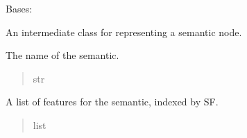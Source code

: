 \documentclass[letterpaper,10pt,english]{sphinxmanual}
\begin{document}

\begin{fulllineitems}
\label{\detokenize{nodes:nodes.nodeBuilder.Semantic}}
\pysigstartsignatures
\pysiglinewithargsret
{}
{}
{}
\pysigstopsignatures
\sphinxAtStartPar
Bases: {\hyperref[\detokenize{nodes:nodes.nodeBuilder.Node}]{}}

\sphinxAtStartPar
An intermediate class for representing a semantic node.

\begin{fulllineitems}
\label{\detokenize{nodes:nodes.nodeBuilder.Semantic.name}}
\pysigstartsignatures
\pysigline
{}
\pysigstopsignatures
\sphinxAtStartPar
The name of the semantic.
\begin{quote}\begin{description}
\sphinxAtStartPar
str

\end{description}\end{quote}

\end{fulllineitems}


\begin{fulllineitems}
\label{\detokenize{nodes:nodes.nodeBuilder.Semantic.features}}
\pysigstartsignatures
\pysigline
{}
\pysigstopsignatures
\sphinxAtStartPar
A list of features for the semantic, indexed by SF.
\begin{quote}\begin{description}
\sphinxAtStartPar
list

\end{description}\end{quote}

\end{fulllineitems}



\end{fulllineitems}
\end{document}

